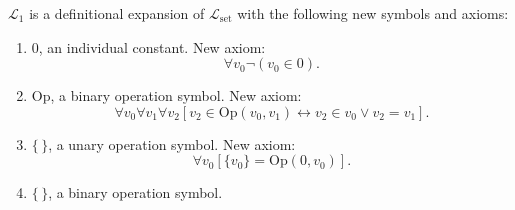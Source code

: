 $\mathcal{L}_1$ is a definitional expansion of $\mathcal{L}_{\text{set}}$ with the following new symbols and axioms:

\begin{enumerate}
\item[(i)] $0$, an individual constant. New axiom:
$$\forall v_0 \neg (v_0 \in 0).$$

\item[(ii)] $\mathrm{Op}$, a binary operation symbol. New axiom:
$$\forall v_0 \forall v_1 \forall v_2 [v_2 \in \mathrm{Op}(v_0, v_1) \leftrightarrow v_2 \in v_0 \lor v_2 = v_1].$$

\item[(iii)] $\{\,\}$, a unary operation symbol. New axiom:
$$\forall v_0 [\{v_0\} = \mathrm{Op}(0, v_0)].$$

\item[(iv)] $\{\,\}$, a binary operation symbol.
\end{enumerate}
